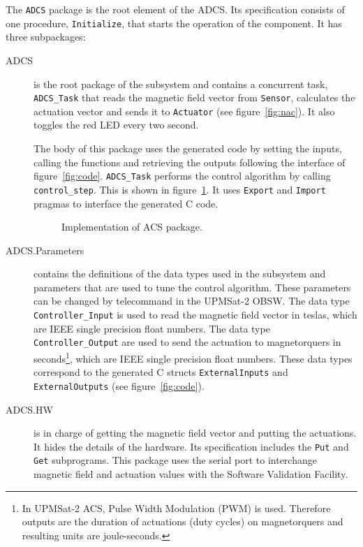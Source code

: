 The {\tt ADCS} package is the root element of the ADCS. Its specification consists of one procedure, {\tt Initialize}, that starts the operation of the component. It has three subpackages:
\begin{description}
\item[ADCS] is the root package of the subsystem and contains a concurrent task, {\tt ADCS\_Task} that reads the magnetic field vector from {\tt Sensor}, calculates the actuation vector and sends it to {\tt Actuator} (see figure~\ref{fig:nac}). It also toggles the red LED every two second.

The body of this package uses the generated code by setting the inputs, calling the functions and retrieving the outputs following the interface of figure~\ref{fig:code}. {\tt ADCS\_Task} performs the control algorithm by calling {\tt control\_step}. This is shown in figure~\ref{fig:acs-body}.
It uses {\tt Export} and {\tt Import} pragmas to interface the generated C code.

\begin{figure}[h]
            \caption{Implementation of ACS package.}
            \label{fig:acs-body}
\end{figure}

\item[ADCS.Parameters] contains the definitions of the data types used in the subsystem and parameters that are used to tune the control algorithm. These parameters can be changed by telecommand in the UPMSat-2 OBSW. The data type {\tt Controller\_Input} is used to read the magnetic field vector in teslas, which are IEEE single precision float numbers. The data type {\tt Controller\_Output} are used to send the actuation to magnetorquers in seconds\footnote{In UPMSat-2 ACS, Pulse Width Modulation (PWM) is used. Therefore outputs are the duration of actuations (duty cycles) on magnetorquers and resulting units are joule-seconds.}, which are IEEE single precision float numbers. These data types correspond to the generated C structs {\tt ExternalInputs} and {\tt ExternalOutputs} (see figure~\ref{fig:code}).

\item[ADCS.HW] is in charge of getting the magnetic field vector and putting the
actuations. It hides the details of the hardware. Its specification includes the {\tt Put} and {\tt Get} subprograms. This package uses the serial port to interchange magnetic field and actuation values with the Software Validation Facility.
\end{description}

